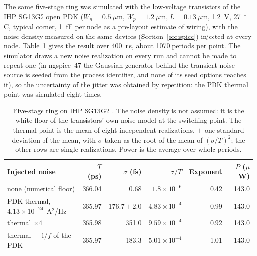 The same five-stage ring was simulated with the low-voltage transistors of
the IHP SG13G2 open \ac{PDK} ($W_n = 0.5~\mu$m, $W_p = 1.2~\mu$m,
$L = 0.13~\mu$m, 1.2~V, 27~$^\circ$C, typical corner, 1~fF per node as a
pre-layout estimate of wiring), with the noise density measured on the
same devices (Section~\ref{sec:spice}) injected at every node.
Table~\ref{tab:ihp_ring} gives the result over 400~ns, about 1070
periods per point. The simulator draws a new noise realization on every
run and cannot be made to repeat one (in ngspice~47 the Gaussian
generator behind the transient noise source is seeded from the process
identifier, and none of its seed options reaches it), so the uncertainty
of the jitter was obtained by repetition: the \ac{PDK} thermal point was
simulated eight times.

\begin{table}[htbp]
\centering
\caption{Five-stage ring on IHP SG13G2 \simu{}. The noise density is not
assumed: it is the white floor of the transistors' own noise model at the
switching point. The thermal point is the mean of eight independent
realizations, $\pm$ one standard deviation of the mean, with $\sigma$
taken as the root of the mean of $(\sigma/T)^2$; the other rows are
single realizations. Power is the average over whole periods.}
\label{tab:ihp_ring}
\small
\begin{tabular}{@{}lrrrrr@{}}
\toprule
Injected noise & $T$ (ps) & $\sigma$ (fs) & $\sigma/T$ & Exponent & $P$ ($\mu$W) \\
\midrule
none (numerical floor)          & 366.04 & 0.68   & $1.8\times10^{-6}$ & 0.42 & 143.0 \\
\ac{PDK} thermal, $4.13\times10^{-24}$~A$^2$/Hz & 365.97 & $176.7 \pm 2.0$ & $4.83\times10^{-4}$ & 0.99 & 143.0 \\
thermal $\times4$               & 365.98 & 351.0  & $9.59\times10^{-4}$ & 0.92 & 143.0 \\
thermal + $1/f$ of the \ac{PDK}  & 365.97 & 183.3  & $5.01\times10^{-4}$ & 1.01 & 143.0 \\
\bottomrule
\end{tabular}
\end{table}

